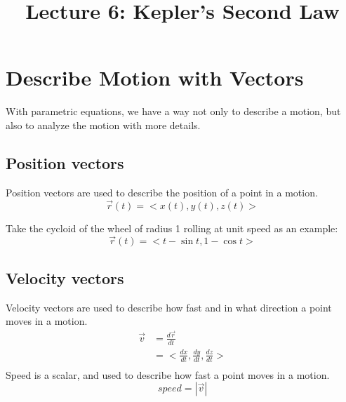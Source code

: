 \documentclass{article}
\title{Lecture 6: Kepler's Second Law}
\author{}
\date{}
\begin{document}
    
\maketitle

\section{Describe Motion with Vectors}

With parametric equations, we have a way not only to describe a motion, but also 
to analyze the motion with more details.

\subsection{Position vectors}

Position vectors are used to describe the position of a point in a motion.
\begin{equation*}
  \vec{r}(t) = <x(t), y(t), z(t)>
\end{equation*}

Take the cycloid of the wheel of radius 1 rolling at unit speed as an example:
\begin{equation*}
  \vec{r}(t) = <t - \sin t, 1 - \cos t>
\end{equation*}

\subsection{Velocity vectors}

Velocity vectors are used to describe how fast and in what direction a point 
moves in a motion.
\begin{equation*}
  \begin{split}
    \vec{v} &= \frac{d\vec{r}}{dt} \\
            &= <\frac{dx}{dt}, \frac{dy}{dt}, \frac{dz}{dt}> \\
  \end{split}
\end{equation*}
Speed is a scalar, and used to describe how fast a point moves in a motion.
\begin{equation*}
  speed = |\vec{v}|
\end{equation*}
\end{document}
